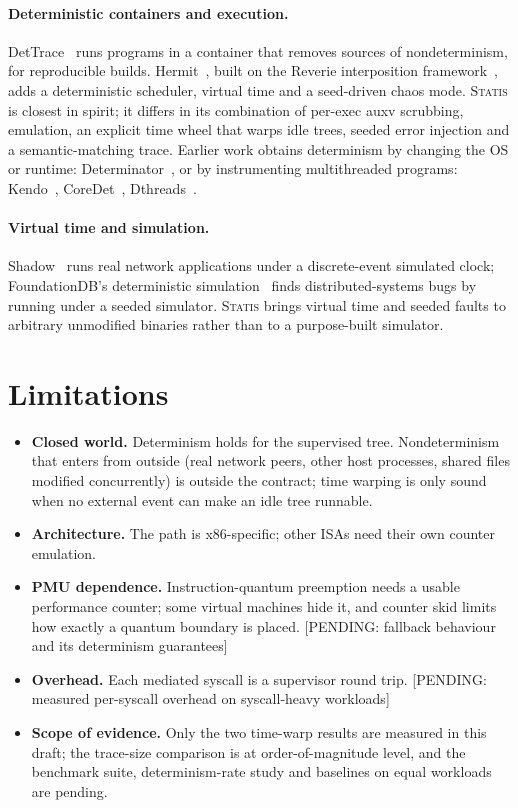 \documentclass[10pt,twocolumn]{article}
\newcommand{\statis}{\textsc{Statis}}
\newcommand{\sys}[1]{\texttt{\detokenize{#1}}}
\newcommand{\pending}[1]{\textcolor{red!70!black}{[PENDING: #1]}}
\begin{document}
\paragraph{Deterministic containers and execution.} DetTrace~\cite{dettrace} runs programs in a container that removes sources of nondeterminism, for reproducible builds. Hermit~\cite{hermit}, built on the Reverie interposition framework~\cite{reverie}, adds a deterministic scheduler, virtual time and a seed-driven chaos mode. \statis{} is closest in spirit; it differs in its combination of per-exec auxv scrubbing, \sys{PR_TSC_SIGSEGV} emulation, an explicit time wheel that warps idle trees, seeded error injection and a semantic-matching trace. Earlier work obtains determinism by changing the OS or runtime: Determinator~\cite{determinator}, or by instrumenting multithreaded programs: Kendo~\cite{kendo}, CoreDet~\cite{coredet}, Dthreads~\cite{dthreads}.

\paragraph{Virtual time and simulation.} Shadow~\cite{shadow} runs real network applications under a discrete-event simulated clock; FoundationDB's deterministic simulation~\cite{fdb} finds distributed-systems bugs by running under a seeded simulator. \statis{} brings virtual time and seeded faults to arbitrary unmodified binaries rather than to a purpose-built simulator.

\section{Limitations}
\label{sec:limits}
\begin{itemize}
\item \textbf{Closed world.} Determinism holds for the supervised tree. Nondeterminism that enters from outside (real network peers, other host processes, shared files modified concurrently) is outside the contract; time warping is only sound when no external event can make an idle tree runnable.
\item \textbf{Architecture.} The \sys{rdtsc} path is x86-specific; other ISAs need their own counter emulation.
\item \textbf{PMU dependence.} Instruction-quantum preemption needs a usable performance counter; some virtual machines hide it, and counter skid limits how exactly a quantum boundary is placed. \pending{fallback behaviour and its determinism guarantees}
\item \textbf{Overhead.} Each mediated syscall is a supervisor round trip. \pending{measured per-syscall overhead on syscall-heavy workloads}
\item \textbf{Scope of evidence.} Only the two time-warp results are measured in this draft; the trace-size comparison is at order-of-magnitude level, and the benchmark suite, determinism-rate study and baselines on equal workloads are pending.
\end{itemize}
\end{document}
